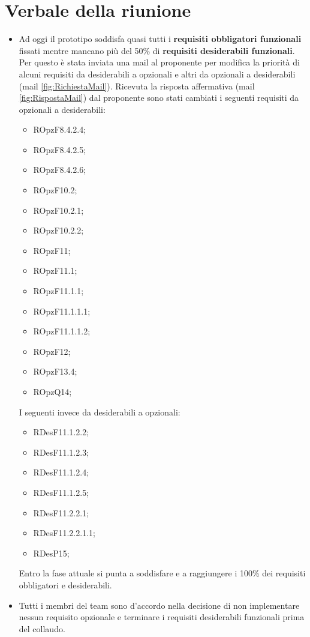 \documentclass[../RiunioneInterna16-02-25.tex]{subfiles}
\begin{document}
\section{Verbale della riunione}		
	
\begin{itemize}

	\item Ad oggi il prototipo soddisfa quasi tutti i \textbf{requisiti obbligatori funzionali} fissati mentre mancano più del 50\% di \textbf{requisiti desiderabili funzionali}. Per questo è stata inviata una mail al proponente per modifica la priorità di alcuni requisiti da desiderabili a opzionali e altri da opzionali a desiderabili (mail \ref{fig:RichiestaMail}). Ricevuta la risposta affermativa (mail \ref{fig:RispostaMail}) dal proponente sono stati cambiati i seguenti requisiti da opzionali a desiderabili:
	\begin{itemize}
		\item ROpzF8.4.2.4;
		\item ROpzF8.4.2.5;
		\item ROpzF8.4.2.6;
		\item ROpzF10.2;
		\item ROpzF10.2.1;
		\item ROpzF10.2.2;
		\item ROpzF11;
		\item ROpzF11.1;
		\item ROpzF11.1.1;
		\item ROpzF11.1.1.1;
		\item ROpzF11.1.1.2;
		\item ROpzF12;
		\item ROpzF13.4;
		\item ROpzQ14;
	\end{itemize}
	
	I seguenti invece da desiderabili a opzionali:
	\begin{itemize}
		\item RDesF11.1.2.2;
		\item RDesF11.1.2.3;
		\item RDesF11.1.2.4;
		\item RDesF11.1.2.5;
		\item RDesF11.2.2.1;
		\item RDesF11.2.2.1.1;
		\item RDesP15;
	\end{itemize}
	Entro la fase attuale si punta a soddisfare e a raggiungere i 100\% dei requisiti obbligatori e desiderabili.
	

	\item Tutti i membri del team sono d'accordo nella decisione di non implementare nessun requisito opzionale e terminare i requisiti desiderabili funzionali prima del collaudo.

	
\end{itemize}
\end{document}
